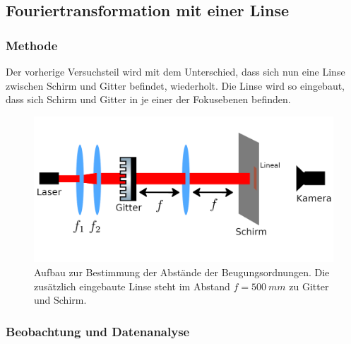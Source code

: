 \documentclass[
	a4paper,
	12pt,
	pagesize,
	ngerman
]{scrartcl}
\begin{document}
	\subsection{Fouriertransformation mit einer Linse} \label{ss_3_beug}

	\subsubsection*{Methode}

		Der vorherige Versuchsteil wird mit dem Unterschied, dass sich nun eine Linse zwischen Schirm und Gitter befindet, wiederholt.
		Die Linse wird so eingebaut, dass sich Schirm und Gitter in je einer der Fokusebenen befinden.

	\begin{figure}[H]
			\includegraphics[width=1\linewidth]{img/gitterlinse}
			\caption{
				Aufbau zur Bestimmung der Abstände der Beugungsordnungen. Die zusätzlich eingebaute Linse steht im Abstand $f=\SI{500}{mm}$ zu Gitter und Schirm.
			}
			\label{fig_gitterlinse}
	\end{figure}

	\subsubsection*{Beobachtung und Datenanalyse}
\end{document}
